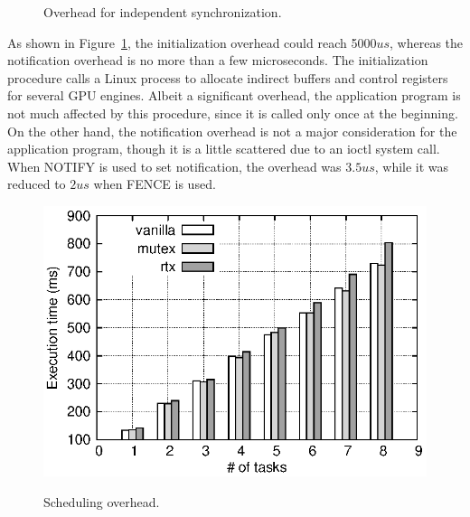 \begin{figure}[!t]
\begin{center}
\caption{Overhead for independent synchronization.}
\vspace{-4mm}
\label{fig:irq_rise_overhead}
\end{center}
\end{figure}

As shown in Figure~\ref{fig:irq_rise_overhead}, the initialization overhead could reach 5000$us$, whereas the notification overhead is no more than a few microseconds.
The initialization procedure calls a Linux process to allocate indirect buffers and control registers for several GPU engines.
Albeit a significant overhead, the application program is not much affected by this procedure, since it is called only once at the beginning.
On the other hand, the notification overhead is not a major consideration for the application program, though it is a little scattered due to an ioctl system call.
When NOTIFY is used to set notification, the overhead was $3.5us$, while it was reduced to $2us$ when FENCE is used.

\label{sec:eval:sched_overhead}

\begin{figure}[!t]
\begin{center}
\includegraphics[width=.44\textwidth]{img/sum_task.eps}
\caption{Scheduling overhead.}
\vspace{-4mm}
\label{fig:fp_task_overhead}
\end{center}
\end{figure}

